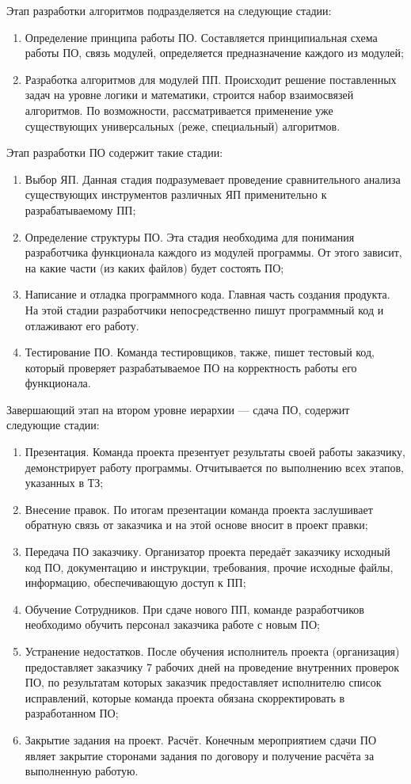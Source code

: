 Этап разработки алгоритмов подразделяется на следующие стадии:
\begin{enumerate}
	\item Определение принципа работы ПО. Составляется принципиальная схема работы ПО, связь модулей, определяется предназначение каждого из модулей;
	\item Разработка алгоритмов для модулей ПП. Происходит решение поставленных задач на уровне логики и математики, строится набор взаимосвязей алгоритмов. По возможности, рассматривается применение уже существующих универсальных (реже, специальный) алгоритмов.
\end{enumerate}

Этап разработки ПО содержит такие стадии:
\begin{enumerate}
	\item Выбор ЯП. Данная стадия подразумевает проведение сравнительного анализа существующих инструментов различных ЯП применительно к разрабатываемому ПП;
	\item Определение структуры ПО. Эта стадия необходима для понимания разработчика функционала каждого из модулей программы. От этого зависит, на какие части (из каких файлов) будет состоять ПО;
	\item Написание и отладка программного кода. Главная часть создания продукта. На этой стадии разработчики непосредственно пишут программный код и отлаживают его работу.
	\item Тестирование ПО. Команда тестировщиков, также, пишет тестовый код, который проверяет разрабатываемое ПО на корректность работы его функционала.
\end{enumerate}

Завершающий этап на втором уровне иерархии --- сдача ПО, содержит следующие стадии:
\begin{enumerate}
	\item Презентация. Команда проекта презентует результаты своей работы заказчику, демонстрирует работу программы. Отчитывается по выполнению всех этапов, указанных в ТЗ;
	\item Внесение правок. По итогам презентации команда проекта заслушивает обратную связь от заказчика и на этой основе вносит в проект правки;
	\item Передача ПО заказчику. Организатор проекта передаёт заказчику исходный код ПО, документацию и инструкции, требования, прочие исходные файлы, информацию, обеспечивающую доступ к ПП;
	\item Обучение Сотрудников. При сдаче нового ПП, команде разработчиков необходимо обучить персонал заказчика работе с новым ПО;
	\item Устранение недостатков. После обучения исполнитель проекта (организация) предоставляет заказчику 7 рабочих дней на проведение внутренних проверок ПО, по результатам которых заказчик предоставляет исполнителю список исправлений, которые команда проекта обязана скорректировать в разработанном ПО;
	\item Закрытие задания на проект. Расчёт. Конечным мероприятием сдачи ПО являет закрытие сторонами задания по договору и получение расчёта за выполненную работую.
\end{enumerate}

